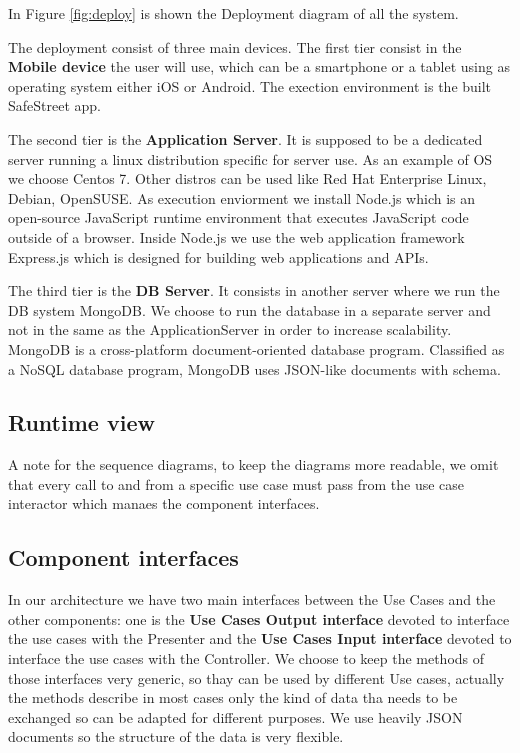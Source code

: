 In Figure \ref{fig:deploy} is shown the Deployment diagram of all the system.

The deployment consist of three main devices. The first tier consist in the \textbf{Mobile device} the user will use, which can be a smartphone or a tablet using as operating system either iOS or Android.
The exection environment is the built SafeStreet app.


The second tier is the \textbf{Application Server}. It is supposed to be a dedicated server running a linux distribution specific for server use. As an example of OS we choose Centos 7. Other distros can be used like Red Hat Enterprise Linux, Debian, OpenSUSE.
As execution enviorment we install Node.js which is an open-source JavaScript runtime environment that executes JavaScript code outside of a browser. Inside Node.js we use the web application framework Express.js which is designed for building web applications and APIs.

The third tier is the \textbf{DB Server}. It consists in another server where we run the DB system MongoDB. We choose to run the database in a separate server and not in the same as the ApplicationServer in order to increase scalability. MongoDB is a cross-platform document-oriented database program. Classified as a NoSQL database program, MongoDB uses JSON-like documents with schema.

\subsection{Runtime view}
A note for the sequence diagrams, to keep the diagrams more readable, we omit that every call to and from a specific use case must pass from the use case interactor which manaes the component interfaces.
 \label{sequencespart}

\subsection{Component interfaces}
In our architecture we have two main interfaces between the Use Cases and the other components: one is the \textbf{Use Cases Output interface} devoted to interface the use cases with the Presenter and the \textbf{Use Cases Input interface} devoted to interface the use cases with the Controller.
We choose to keep the methods of those interfaces very generic, so thay can be used by different Use cases, actually the methods describe in most cases only the kind of data tha needs to be exchanged so can be adapted for different purposes. We use heavily JSON documents so the structure of the data is very flexible.

